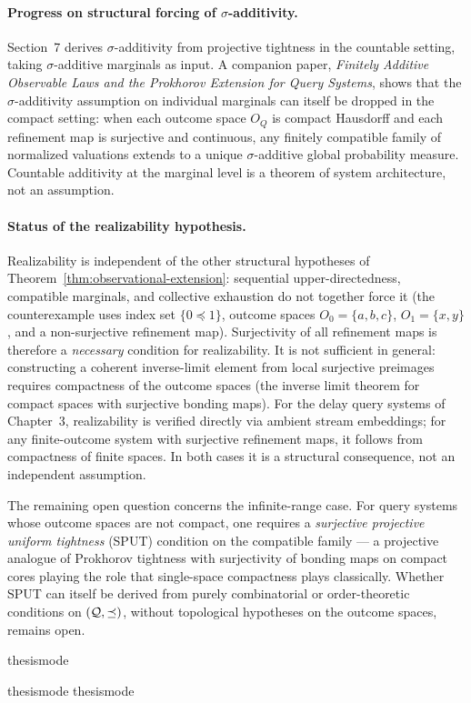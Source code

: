 \paragraph{Progress on structural forcing of $\sigma$-additivity.}
Section~7 derives $\sigma$-additivity from projective tightness in
the countable setting, taking $\sigma$-additive marginals as input.
A companion paper, \emph{Finitely Additive Observable Laws and the
Prokhorov Extension for Query Systems}, shows that the $\sigma$-additivity
assumption on individual marginals can itself be dropped in the compact
setting: when each outcome space $O_Q$ is compact Hausdorff and each
refinement map is surjective and continuous, any finitely compatible
family of normalized valuations extends to a unique $\sigma$-additive
global probability measure.  Countable additivity at the marginal level
is a theorem of system architecture, not an assumption.

\paragraph{Status of the realizability hypothesis.}
Realizability is independent of the other structural hypotheses of
Theorem~\ref{thm:observational-extension}: sequential upper-directedness,
compatible marginals, and collective exhaustion do not together force it
(the counterexample uses index set $\{0 \preceq 1\}$, outcome spaces $O_0 = \{a,b,c\}$,
$O_1 = \{x,y\}$, and a non-surjective refinement map).
Surjectivity of all refinement maps is therefore a \emph{necessary} condition for
realizability.  It is not sufficient in general: constructing a coherent inverse-limit
element from local surjective preimages requires compactness of the outcome spaces
(the inverse limit theorem for compact spaces with surjective bonding maps).
For the delay query systems of Chapter~3, realizability is verified directly via
ambient stream embeddings; for any finite-outcome system with surjective refinement
maps, it follows from compactness of finite spaces.  In both cases it is a structural
consequence, not an independent assumption.

The remaining open question concerns the infinite-range case.
For query systems whose outcome spaces are not compact, one requires
a \emph{surjective projective uniform tightness} (SPUT) condition on
the compatible family --- a projective analogue of Prokhorov tightness
with surjectivity of bonding maps on compact cores playing the role
that single-space compactness plays classically.  Whether SPUT can
itself be derived from purely combinatorial or order-theoretic
conditions on $(\mathcal{Q}, \preceq)$, without topological hypotheses on
the outcome spaces, remains open.


\ifcsname thesismode\endcsname\else


\fi

\ifcsname thesismode\endcsname\else
\ifcsname thesismode\endcsname\else\fi
\fi
